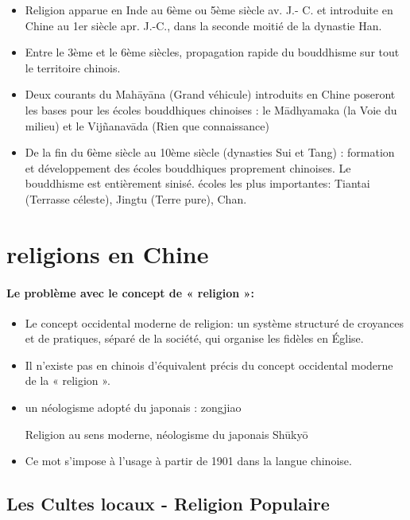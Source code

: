 \begin{itemize}
 \item 	Religion apparue en Inde au 6ème ou 5ème siècle av. J.- C. et introduite en Chine au 1er siècle apr. J.-C., dans la seconde moitié de la dynastie Han.
 \item 	Entre le 3ème et le 6ème siècles, propagation rapide du bouddhisme sur tout le territoire chinois.
 \item Deux courants du Mahāyāna (Grand véhicule) introduits en Chine poseront les bases pour les écoles bouddhiques chinoises : le Mādhyamaka (la Voie du milieu) et le Vijñanavāda (Rien que
connaissance)
 \item De la fin du 6ème siècle au 10ème siècle (dynasties Sui et Tang) : formation et développement des écoles bouddhiques proprement chinoises. Le bouddhisme est entièrement sinisé.
écoles les plus importantes: Tiantai (Terrasse céleste), Jingtu (Terre pure), Chan.
\end{itemize}


\section{religions en Chine}
\paragraph{Le problème avec le concept de « religion »:}

\begin{itemize}
    \item  	Le concept occidental moderne de religion:
un système structuré de croyances et de pratiques, séparé de la société, qui organise les fidèles en Église.
    \item  Il n’existe pas en chinois d’équivalent précis du concept occidental moderne de la « religion ».
    \item  	un néologisme adopté du japonais : zongjiao  
    \begin{Def}[zongjiao - 宗教 ]
    Religion au sens moderne, néologisme du japonais  Shūkyō
\end{Def}
    \item  	Ce mot s’impose à l’usage à partir de 1901 dans la langue chinoise.
\end{itemize}

 
\subsection{Les Cultes locaux - Religion Populaire}

